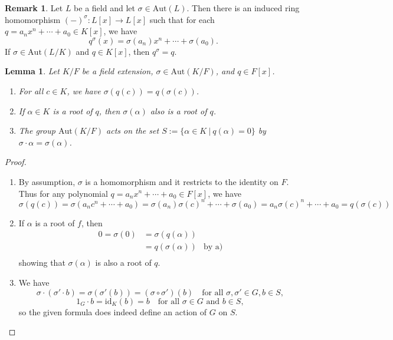 \documentclass[12pt]{report}
\newtheorem{lemma}[theorem]{Lemma}
\numberwithin{equation}{section}
\numberwithin{theorem}{chapter}
\theoremstyle{definition}
\newtheorem*{basic properties}{Basic Properties}
\newtheorem*{Important Remark}{Important Remark}
\newtheorem{remark}[theorem]{Remark}
\begin{document}
\begin{remark}\index{$(-)^\sigma$}\label{remark sigma}
Let $L$ be a field and let $\sigma \in \mathrm{Aut}(L)$. Then there is an induced ring homomorphism $(-)^\sigma\!:L[x]\to L[x]$ such that for each $q = a_nx^n + \cdots + a_0 \in K[x]$, we have
$$q^\sigma(x) = \sigma(a_n)x^n + \cdots + \sigma(a_0).$$ 
If $\sigma \in \mathrm{Aut}(L/K)$ and $q \in K[x]$, then $q^\sigma = q$.
\end{remark}


\begin{lemma}\label{lemma roots}
Let $K/F$ be a field extension, $\sigma \in \mathrm{Aut}(K/F)$, and $q \in F[x]$. 
\begin{enumerate}[label=\alph*),leftmargin=15pt]
\item For all $c \in K$, we have $\sigma(q(c))=q(\sigma(c))$. 
\item If $\alpha \in K$ is a root of $q$, then $\sigma(\alpha)$ also is a root of $q$.
\item The group $\mathrm{Aut}(K/F)$ acts on the set $S:=\{ \alpha\in K \ | \ q(\alpha)=0\}$ by $\sigma \cdot \alpha= \sigma(\alpha)$.
\end{enumerate}
\end{lemma}

\begin{proof}$\,$
\begin{enumerate}[label=\alph*),leftmargin=15pt]
\item By assumption, $\sigma$ is a homomorphism and it restricts to the identity on $F$. Thus for any polynomial $q = a_nx^n + \cdots + a_0 \in F[x]$, we have
$$\sigma(q(c)) = \sigma(a_n c^n + \cdots + a_0) = \sigma(a_n) \sigma(c)^n + \cdots + \sigma(a_0) = a_n \sigma(c)^n + \cdots + a_0 = q(\sigma(c))$$
\item If $\alpha$ is a root of $f$, then
$$\begin{aligned}
0 = \sigma(0) & = \sigma(q(\alpha)) \\
& = q(\sigma(\alpha)) & \textrm{by a)}\\
\end{aligned}$$
showing that $\sigma(\alpha)$ is also a root of $q$.
\item We have $$\sigma \cdot (\sigma'\cdot b) = \sigma(\sigma' (b)) = (\sigma\circ\sigma')(b) \quad \textrm{for all } \sigma,\sigma' \in G, b\in S,$$
$$1_G\cdot b=\mathrm{id}_K(b)=b \quad  \textrm{for all } \sigma \in G \textrm{ and } b\in S,$$
so the given formula does indeed define an action of $G$ on $S$.
\end{enumerate}
\end{proof}
\end{document}
